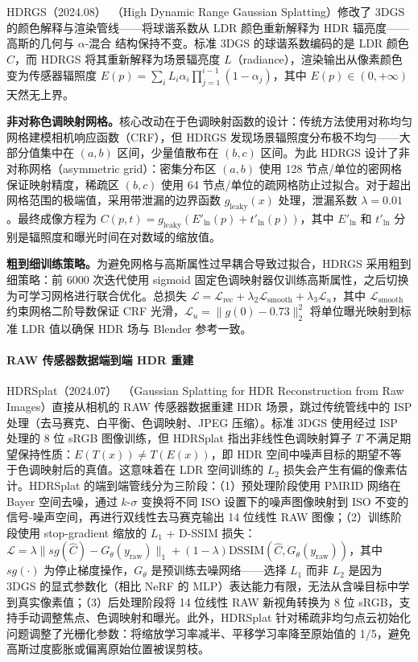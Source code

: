 HDRGS（2024.08）~\cite{2408_06543}（High Dynamic Range Gaussian Splatting）修改了 3DGS 的颜色解释与渲染管线——将球谐系数从 LDR 颜色重新解释为 HDR 辐亮度——高斯的几何与 $\alpha$-混合 结构保持不变。标准 3DGS 的球谐系数编码的是 LDR 颜色 $C$，而 HDRGS 将其重新解释为场景辐亮度 $L$（radiance），渲染输出从像素颜色变为传感器辐照度 $E(p) = \sum_{i} L_i \alpha_i \prod_{j=1}^{i-1}(1-\alpha_j)$，其中 $E(p) \in (0, +\infty)$ 天然无上界。

\textbf{非对称色调映射网格。}核心改动在于色调映射函数的设计：传统方法使用对称均匀网格建模相机响应函数（CRF），但 HDRGS 发现场景辐照度分布极不均匀——大部分值集中在 $(a, b)$ 区间，少量值散布在 $(b, c)$ 区间。为此 HDRGS 设计了非对称网格（asymmetric grid）：密集分布区 $(a,b)$ 使用 128 节点/单位的密网格保证映射精度，稀疏区 $(b,c)$ 使用 64 节点/单位的疏网格防止过拟合。对于超出网格范围的极端值，采用带泄漏的边界函数 $g_{\text{leaky}}(x)$ 处理，泄漏系数 $\lambda = 0.01$。最终成像方程为 $C(p,t) = g_{\text{leaky}}(E'_{\ln}(p) + t'_{\ln}(p))$，其中 $E'_{\ln}$ 和 $t'_{\ln}$ 分别是辐照度和曝光时间在对数域的缩放值。

\textbf{粗到细训练策略。}为避免网格与高斯属性过早耦合导致过拟合，HDRGS 采用粗到细策略：前 6000 次迭代使用 sigmoid 固定色调映射器仅训练高斯属性，之后切换为可学习网格进行联合优化。总损失 $\mathcal{L} = \mathcal{L}_{\text{rec}} + \lambda_2 \mathcal{L}_{\text{smooth}} + \lambda_3 \mathcal{L}_u$，其中 $\mathcal{L}_{\text{smooth}}$ 约束网格二阶导数保证 CRF 光滑，$\mathcal{L}_u = \|g(0) - 0.73\|_2^2$ 将单位曝光映射到标准 LDR 值以确保 HDR 场与 Blender 参考一致。

\paragraph{RAW 传感器数据端到端 HDR 重建}

HDRSplat（2024.07）~\cite{2407_16503}（Gaussian Splatting for HDR Reconstruction from Raw Images）直接从相机的 RAW 传感器数据重建 HDR 场景，跳过传统管线中的 ISP 处理（去马赛克、白平衡、色调映射、JPEG 压缩）。标准 3DGS 使用经过 ISP 处理的 8 位 sRGB 图像训练，但 HDRSplat 指出非线性色调映射算子 $T$ 不满足期望保持性质：$E(T(x)) \neq T(E(x))$，即 HDR 空间中噪声目标的期望不等于色调映射后的真值。这意味着在 LDR 空间训练的 $L_2$ 损失会产生有偏的像素估计。HDRSplat 的端到端管线分为三阶段：（1）预处理阶段使用 PMRID 网络在 Bayer 空间去噪，通过 $k$-$\sigma$ 变换将不同 ISO 设置下的噪声图像映射到 ISO 不变的信号-噪声空间，再进行双线性去马赛克输出 14 位线性 RAW 图像；（2）训练阶段使用 stop-gradient 缩放的 $L_1$ + D-SSIM 损失：$\mathcal{L} = \lambda \|sg(\hat{C}) - G_\theta(y_{\text{raw}})\|_1 + (1-\lambda) \text{DSSIM}(\hat{C}, G_\theta(y_{\text{raw}}))$，其中 $sg(\cdot)$ 为停止梯度操作，$G_\theta$ 是预训练去噪网络——选择 $L_1$ 而非 $L_2$ 是因为 3DGS 的显式参数化（相比 NeRF 的 MLP）表达能力有限，无法从含噪目标中学到真实像素值；（3）后处理阶段将 14 位线性 RAW 新视角转换为 8 位 sRGB，支持手动调整焦点、色调映射和曝光。此外，HDRSplat 针对稀疏非均匀点云初始化问题调整了光栅化参数：将缩放学习率减半、平移学习率降至原始值的 1/5，避免高斯过度膨胀或偏离原始位置被误剪枝。

